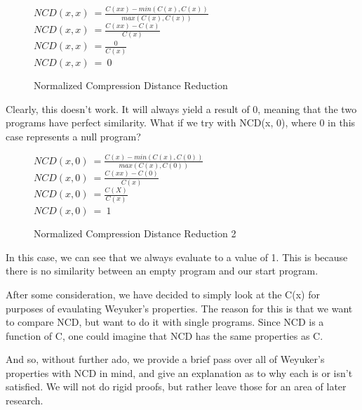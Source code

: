 \documentclass[]{article}
\begin{document}
\begin{figure}[h]
	\caption{Normalized Compression Distance Reduction}
	\label{ncd_reduction}
	\centering
	$NCD(x,x) ~= \frac{C(xx) - min(C(x),C(x))}{max(C(x),C(x))}$ \\
	$NCD(x,x) ~= \frac{C(xx) - C(x)}{C(x)}$  \\
	$NCD(x,x) ~= \frac{0}{C(x)}$ \\
	$NCD(x,x) ~= ~0$ \\
\end{figure}

Clearly, this doesn't work.
It will always yield a result of 0, meaning that the two programs have perfect similarity.
What if we try with NCD(x, 0), where 0 in this case represents a null program?


\begin{figure}[h]
	\caption{Normalized Compression Distance Reduction 2}
	\label{ncd_reduction2}
	\centering
	$NCD(x,0) ~= \frac{C(x) - min(C(x),C(0))}{max(C(x),C(0))}$ \\
	$NCD(x,0) ~= \frac{C(xx) - C(0)}{C(x)}$ \\
	$NCD(x,0) ~= \frac{C(X)}{C(x)}$ \\
	$NCD(x,0) ~= ~1$ \\
\end{figure}

In this case, we can see that we always evaluate to a value of 1.
This is because there is no similarity between an empty program and our start program. 

After some consideration, we have decided to simply look at the C(x) for purposes of evaulating Weyuker's properties.
The reason for this is that we want to compare NCD, but want to do it with single programs.
Since NCD is a function of C, one could imagine that NCD has the same properties as C.

And so, without further ado, we provide a brief pass over all of Weyuker's properties with NCD in mind, and give an explanation as to why each is or isn't satisfied. 
We will not do rigid proofs, but rather leave those for an area of later research.
\end{document}
